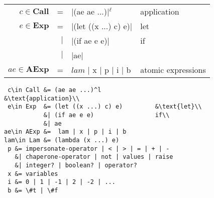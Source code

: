\documentclass{sigplanconf}
\begin{document}
\newcommand{\true}[0]{\mathrm{\#t}}
\newcommand{\false}[0]{\mathrm{\#f}}
\setlength{\tabcolsep}{1pt}
\begin{figure}
\label{fig:syntax}

\newcommand{\stxclass}[4]{$#1\in\mathbf{#2}$ &=& #3 & #4}
\newcommand{\stxclasscont}[2]{&$|$& #1 & #2}


\begin{tabular}{ r | r | l | l }
\stxclass{c}{Call}{\scheme|(ae ae ...)|$^\ell$}{application}\\
\stxclass{e}{Exp}{\scheme|(let ((x ...) c) e)|}{let}\\
\stxclasscont{\scheme|(if ae e e)|}{if}\\
\stxclasscont{\scheme|ae|}{}\\
\stxclass{ae}{AExp}{$\mathit{lam}$ $|$ x $|$ p $|$ i $|$ b}{atomic expressions}
\end{tabular}

\begin{verbatim}
 c\in Call &= (ae ae ...)^l               &\text{application}\\
 e\in Exp  &= (let ((x ...) c) e)         &\text{let}\\
           &| (if ae e e)                 if\\
           &| ae
ae\in AExp &=  lam | x | p | i | b
lam\in Lam &= (lambda (x ...) e)
 p &= impersonate-operator | < | > | = | + | -
   &| chaperone-operator | not | values | raise
   &| integer? | boolean? | operator?
 x &= variables
 i &= 0 | 1 | -1 | 2 | -2 | ...
 b &= \#t | \#f
\end{verbatim}



\end{figure}
\end{document}
